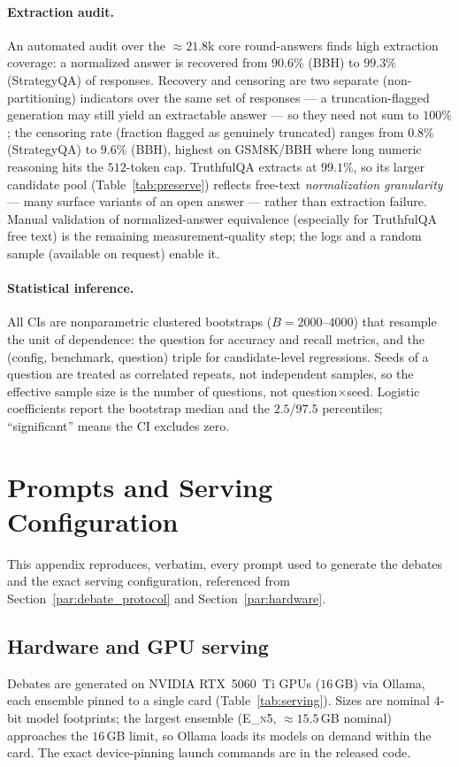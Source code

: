 \paragraph{Extraction audit.}
An automated audit over the $\approx\!21.8$k core round-answers finds high extraction coverage: a normalized
answer is recovered from $90.6\%$ (BBH) to $99.3\%$ (StrategyQA) of responses. Recovery and censoring are two
separate (non-partitioning) indicators over the same set of responses --- a truncation-flagged generation may
still yield an extractable answer --- so they need not sum to $100\%$; the censoring rate (fraction flagged as
genuinely truncated) ranges from $0.8\%$ (StrategyQA) to $9.6\%$ (BBH), highest on GSM8K/BBH where long
numeric reasoning hits the $512$-token cap. TruthfulQA extracts at
$99.1\%$, so its larger candidate pool (Table~\ref{tab:preserve}) reflects free-text \emph{normalization
granularity} --- many surface variants of an open answer --- rather than extraction failure. Manual
validation of normalized-answer equivalence (especially for TruthfulQA free text) is the remaining
measurement-quality step; the logs and a random sample (available on request) enable it.

\paragraph{Statistical inference.}
\label{app:stats}
All CIs are nonparametric clustered bootstraps ($B=2000$--$4000$) that resample the unit of dependence: the
question for accuracy and recall metrics, and the (config, benchmark, question) triple for candidate-level
regressions. Seeds of a question are treated as correlated repeats, not independent samples, so the
effective sample size is the number of questions, not question$\times$seed. Logistic coefficients report
the bootstrap median and the $2.5$/$97.5$ percentiles; ``significant'' means the CI excludes zero.

\section{Prompts and Serving Configuration}
\label{app:config}

This appendix reproduces, verbatim, every prompt used to generate the debates and the exact serving
configuration, referenced from Section~\ref{par:debate_protocol} and Section~\ref{par:hardware}.

\subsection{Hardware and GPU serving}
Debates are generated on NVIDIA RTX~5060~Ti GPUs ($16$\,GB) via Ollama, each ensemble pinned to a single
card (Table~\ref{tab:serving}). Sizes are nominal $4$-bit model footprints; the largest ensemble
(\textsc{E\_n5}, $\approx\!15.5$\,GB nominal) approaches the $16$\,GB limit, so Ollama loads its models on
demand within the card. The exact device-pinning launch commands are in the released code.

